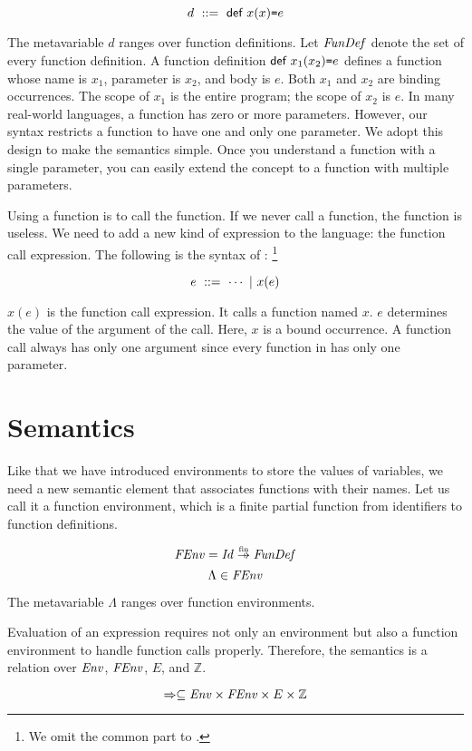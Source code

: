 \[ d\ ::=\ \textsf{def}\ x(x)\texttt{=} e \]

The metavariable $d$ ranges over function definitions. Let $\mbox{\emph{FunDef}}$
denote the set of every function definition. A function definition
$\textsf{def}\ x_1(x_2)\texttt{=} e$ defines a function whose name is $x_1$, parameter is
$x_2$, and body is $e$. Both $x_1$ and $x_2$ are binding occurrences.
The scope of $x_1$ is the entire program; the scope of $x_2$ is $e$.
In many real-world languages, a function has zero or
more parameters. However, our syntax restricts a function to have one and only
one parameter. We adopt this design to make the semantics simple. Once you
understand a function with a single parameter, you can easily extend the concept
to a function with multiple parameters.

Using a function is to call the function. If we never call a function, the
function is useless. We need to add a new kind of expression to the language:
the function call expression. The following is the syntax of \Lang:
\footnote{We omit the common part to \plang.}

\[ e\ ::=\ \cdots\ |\ \eappfo{x}{e} \]

$x(e)$ is the function call expression. It calls a function named $x$. $e$
determines the value of the argument of the call. Here, $x$ is a bound
occurrence. A function call always has only one argument since every function in
\Lang has only one parameter.

\section{Semantics}

Like that we have introduced environments to store the values of variables,
we need a new semantic element that associates functions with their names.
Let us call it a function environment, which is a finite partial function from
identifiers to function definitions.

\[\embox{FEnv}=\embox{Id}\finto\embox{FunDef}\]
\[\Lambda\in\mbox{\emph{FEnv}}\]

The metavariable $\Lambda$ ranges over function environments.

Evaluation of an expression requires not only an environment but also a function
environment to handle function calls properly.
Therefore, the semantics is a relation over $\mbox{\emph{Env}}$,
$\mbox{\emph{FEnv}}$, $E$, and $\mathbb{Z}$.

\[\Rightarrow\subseteq\mbox{\emph{Env}}\times\mbox{\emph{FEnv}}\times E\times\mathbb{Z}\]

